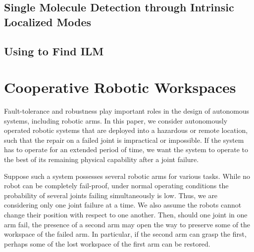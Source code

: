 \documentclass[12pt]{report}
\begin{document}
\section{Single Molecule Detection through Intrinsic Localized Modes}
	
\section{Using \bertini to Find ILM}
	








%
%
%
%






\chapter{Cooperative Robotic Workspaces}


Fault-tolerance and robustness play important roles in the design of autonomous systems, including robotic arms.   In this paper, we consider  autonomously operated robotic systems that are deployed into a hazardous or remote location, such that the repair on a failed joint is impractical or impossible.  If the system has to operate for an extended period of time, we want the system to operate to the best of its 
remaining physical capability after a joint failure. 

Suppose such a system possesses several robotic  arms for various tasks.  While no robot can be completely fail-proof, under normal operating conditions the probability of several joints failing simultaneously is low.  Thus, we are considering only one joint failure at a time.   We also assume the robots cannot change their position with respect to one another.  Then, should one joint in one arm fail,  the presence of a second arm may open the way to preserve some of the workspace of the failed arm.  In particular, if the second arm can grasp the first, perhaps some of the lost workspace of the first arm can be restored.  
\end{document}
